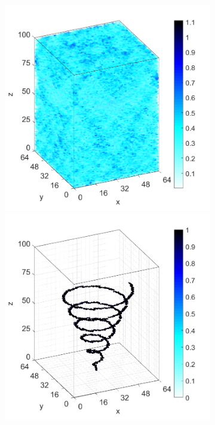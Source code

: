 \documentclass[9pt,twocolumn,twoside]{osajnl}
\begin{document}
\begin{figure}[H]
{\begin{subfigure}[b]{0.95\columnwidth}
\begin{minipage}[b]{0.15\columnwidth}
    \end{minipage}
    \includegraphics[width=0.33\columnwidth]{conhelix_complex_BP_3d}
    \includegraphics[width=0.33\columnwidth]{conhelix_complex_TwIST_3d}
    \caption{}
\end{subfigure}}


\end{figure}
\end{document}
